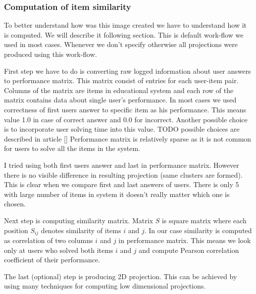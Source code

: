 \documentclass[
  digital, %
  table,   %
  nolof,     %
  nolot,     %
  nocover
]{fithesis3}
\begin{document}
\subsubsection{Computation of item
similarity}\label{computation-of-item-similarity}


To better understand how was this image created we have to understand
how it is computed. We will describe it following section. This is
default work-flow we used in most cases. Whenever we don't specify
otherwise all projections were produced using this work-flow.


First step we have to do is converting raw logged information about
user answers to performance matrix. This matrix consist of entries for
each user-item pair. Columns of the matrix are items in educational
system and each row of the matrix contains data about single user's
performance. In most cases we used correctness of first users answer
to specific item as his performance. This means value 1.0 in case of
correct answer and 0.0 for incorrect. Another possible choice is to
incorporate user solving time into this value. TODO possible choices
are described in article {[}{]} Performance matrix is relatively
sparse as it is not common for users to solve all the items in the
system.

I tried using both first users answer and last in performance matrix.
However there is no visible difference in resulting projection (same
clusters are formed). This is clear when we compare first and last
answers of users. There is only 5%
with large number of items in system it doesn't really matter which one
is chosen.


Next step is computing similarity matrix. Matrix $S$ is square
matrix where each position $S_{ij}$ denotes similarity of items
$i$ and $j$. In our case similarity is computed as correlation of
two columns $i$ and $j$ in performance matrix. This means we look
only at users who solved both items $i$ and $j$ and compute
Pearson correlation coefficient of their performance.


The last (optional) step is producing 2D projection. This can be
achieved by using many techniques for computing low dimensional
projections.

\end{document}
